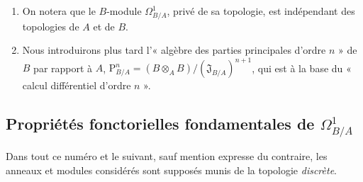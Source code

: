 \begin{remarks}[20.4.14]
\label{0.20.4.14-fr}
\begin{enumerate}
  \item[\rm(i)] On notera que le $B$-module $\Omega^1_{B/A}$, privé de sa
  topologie, est indépendant des topologies de $A$ et de $B$.
  \item[\rm(ii)] Nous introduirons plus tard l'« algèbre des parties
  principales d'ordre $n$ » de $B$ par rapport à $A$,
  $\mathrm{P}^n_{B/A}=(B\otimes_A B)/(\mathfrak{J}_{B/A})^{n+1}$, qui est à
  la base du « calcul différentiel d'ordre $n$ ».
\end{enumerate}
\end{remarks}

\subsection{Propriétés fonctorielles fondamentales de
\texorpdfstring{$\Omega^1_{B/A}$}{Omega1(B/A)}}
\label{subsection:0.20.5-fr}

\begin{env}[20.5.1]
\label{0.20.5.1-fr}
Dans tout ce numéro et le suivant, sauf mention expresse du contraire, les
anneaux et modules considérés sont supposés munis de la topologie
\emph{discrète}.
\end{env}

